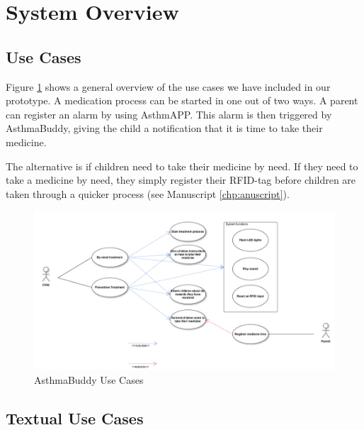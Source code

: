 \section{System Overview}

\subsection{Use Cases}
Figure \ref{fig:pi-use-cases} shows a general overview of the use cases we have included in our prototype. A medication process can be started in one out of two ways. 
A parent can register an alarm by using AsthmAPP. This alarm is then triggered by AsthmaBuddy, giving the child a notification that it is time to take their medicine.

The alternative is if children need to take their medicine by need. If they need to take a medicine by need, they simply register their RFID-tag before children are taken through a quicker process (see Manuscript \ref{chp:anuscript}).  

\begin{figure}[H] 
	\centering
		\includegraphics[width=0.8\paperwidth]{Pictures/usecases.png}
	\caption{AsthmaBuddy Use Cases}
	\label{fig:pi-use-cases}
\end{figure}

\subsection{Textual Use Cases}

